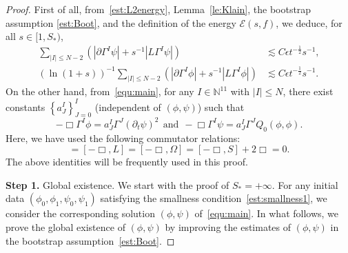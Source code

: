 \documentclass[10pt,a4paper]{amsart}
\begin{document}
\begin{proof}
    First of all, from~\eqref{est:L2energy}, Lemma~\ref{le:Klain}, the bootstrap assumption \eqref{est:Boot}, and the definition of the energy $\mathcal{E}(s,f)$,  we deduce, for all $s\in [1,S_{*})$, 
\begin{equation}\label{est:Bootpoint}
    \begin{aligned}
       \sum_{|I|\le N-2}
       \left(\left|\partial \Gamma^{I}\psi\right|+s^{-1}\left|L\Gamma^{I}\psi\right|\right)
      & \lesssim C\epsilon t^{-\frac{1}{2}}s^{-1},\\
      (\ln(1+s))^{-1}
      \sum_{|I|\le N-2}
       \left(\left|\partial \Gamma^{I}\phi\right|+s^{-1}\left|L\Gamma^{I}\phi\right|\right)
      & \lesssim C\epsilon t^{-\frac{1}{2}}s^{-1}.
       \end{aligned}
    \end{equation}
    On the other hand, from~\eqref{equ:main}, for any $I\in \mathbb{N}^{11}$ with $|I|\le N$, there exist constants $\left\{a_{J}^{I}\right\}_{J=0}^{I}$  (independent of $(\phi,\psi)$) such that
\begin{equation*}
-\Box{\Gamma}^{I}\phi=a_{J}^{I}{\Gamma}^{J}\left(\partial_{t}\psi\right)^{2} \ \ \mbox{and} \ \
-\Box {\Gamma}^{I}\psi={ a}_{J}^{I}{\Gamma}^{J}Q_{0}(\phi,\phi).
\end{equation*}
Here, we have used the following commutator relations: 
\begin{equation*}
[-\Box, \partial]=[-\Box, L]=[-\Box, \Omega]=[-\Box,S]+2\Box=0.
\end{equation*}
The above identities will be frequently used in this proof. 

\smallskip
{\bf Step 1.} Global existence. We start with the proof of $S_{*}=+\infty$. 
For any initial data $(\phi_{0},\phi_1,{\psi}_{0},\psi_1)$ satisfying the smallness condition~\eqref{est:smallness1}, we consider the corresponding solution $(\phi,\psi)$ of~\eqref{equ:main}. In what follows, we prove the global existence of $(\phi,\psi)$ by improving the estimates of $(\phi,\psi)$ in the bootstrap assumption~\eqref{est:Boot}.


\end{proof}
\end{document}
